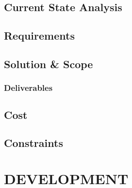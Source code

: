 \documentclass[letterpaper,11pt,2p]{elsarticle}
\begin{document}
\subsection{ Current State Analysis}
\label{subsec1}





\subsection{ Requirements}
\label{subsec1}





\subsection{ Solution \& Scope}
\label{subsec1}





\subsubsection{ Deliverables}
\label{subsec1}





\subsection{ Cost}
\label{subsec1}





\subsection{ Constraints}
\label{subsec1}




\section{ DEVELOPMENT}%
\label{FEA}%



\end{document}
